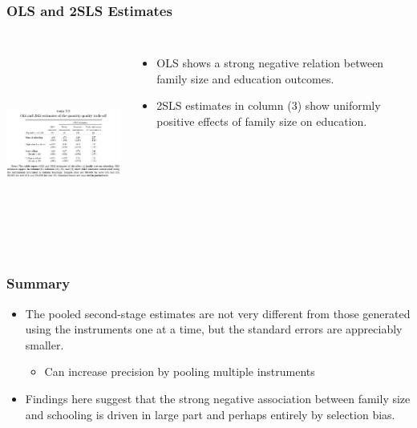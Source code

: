 \documentclass{beamer}
\begin{document}
\begin{frame}
\frametitle{OLS and 2SLS Estimates}

\begin{columns}
\includegraphics[width=6.5cm,height=6.5cm,keepaspectratio]{Table 3.5} 

\begin{itemize}
	\item OLS shows a strong negative relation between family size and education outcomes.
	\item 2SLS estimates in column (3) show uniformly positive effects of family size on education.
\end{itemize}

\end{columns}
\end{frame}
\begin{frame}
\frametitle{Summary}

\begin{itemize}
	\item The pooled second-stage estimates are not very different from those generated using the instruments one at a time, but the standard errors are appreciably smaller.
\begin{itemize}
	\item[\rightarrow] Can increase precision by pooling multiple instruments
\end{itemize}
\item Findings here suggest that the strong negative association between family size and schooling is driven in large part and perhaps entirely by selection bias.
\end{itemize}
\end{frame}
\end{document}
